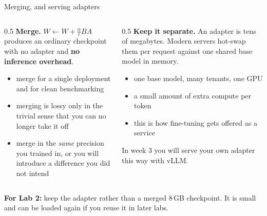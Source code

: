 \documentclass[aspectratio=169,10pt]{beamer}
\begin{document}
\begin{frame}{Merging, and serving adapters}
  \begin{columns}[T]
    \begin{column}{0.5\textwidth}
      \textbf{Merge.} $W \leftarrow W + \frac{\alpha}{r}BA$ produces an
      ordinary checkpoint with no adapter and \textbf{no inference overhead}.
      \vspace{0.4em}
      \begin{itemize}
        \item merge for a single deployment and for clean benchmarking
        \item merging is lossy only in the trivial sense that you can no longer
          take it off
        \item merge in the \emph{same} precision you trained in, or you will
          introduce a difference you did not intend
      \end{itemize}
    \end{column}
    \begin{column}{0.5\textwidth}
      \textbf{Keep it separate.} An adapter is tens of megabytes. Modern
      servers hot-swap them per request against one shared base model in
      memory.
      \vspace{0.4em}
      \begin{itemize}
        \item one base model, many tenants, one GPU
        \item a small amount of extra compute per token
        \item this is how fine-tuning gets offered as a service
      \end{itemize}
      \vspace{0.3em}
      \small
      In week 3 you will serve your own adapter this way with vLLM.
    \end{column}
  \end{columns}
  \vspace{0.4em}
  \raggedright
  \small
  \textbf{For Lab 2:} keep the adapter rather than a merged 8\,GB checkpoint.
  It is small and can be loaded again if you reuse it in later labs.
\end{frame}
\end{document}
